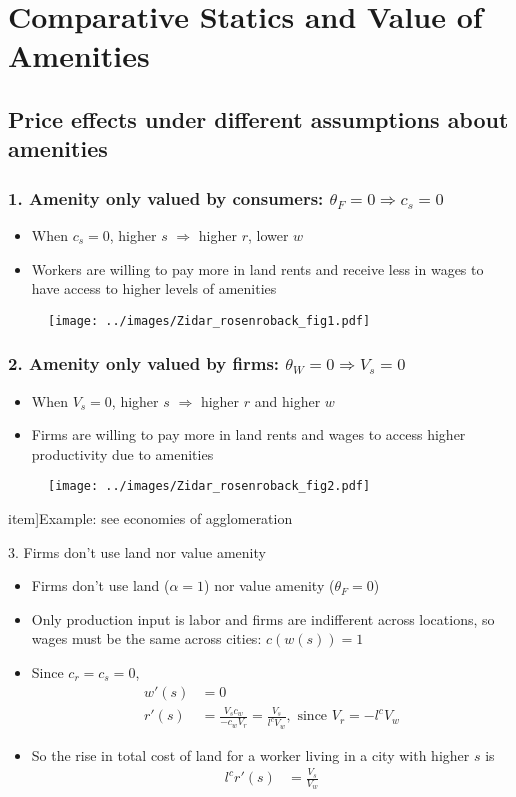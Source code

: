\documentclass[11pt,notes=hide,aspectratio=169]{beamer}
\begin{document}
\section{Comparative Statics and Value of Amenities}
\subsection{Price effects under different assumptions about amenities}
\begin{frame}
\frametitle{1. Amenity only valued by consumers: $\theta_F=0 \Rightarrow c_s = 0$}
\begin{itemize}
\item When $c_s = 0$, higher $s$ $\Rightarrow$ higher $r$, lower $w$
\item Workers are willing to pay more in land rents and receive less in wages to have access to higher levels of amenities
\end{itemize}
\begin{figure}
\texttt{[image: ../images/Zidar\_rosenroback\_fig1.pdf]}
\end{figure}
\end{frame}
\begin{frame}
\frametitle{2. Amenity only valued by firms: $\theta_W=0 \Rightarrow  V_s = 0$}
\begin{itemize}
\item When $V_s = 0$, higher $s$ $\Rightarrow$ higher $r$ and higher $w$
\item Firms are willing to pay more in land rents and wages to access higher productivity due to amenities
\end{itemize}
\begin{figure}
\texttt{[image: ../images/Zidar\_rosenroback\_fig2.pdf]}
\end{figure}
item]{Example: see economies of agglomeration}
\end{frame}
\begin{frame}{3. Firms don't use land nor value amenity}
\begin{itemize}
\item Firms don't use land ($\alpha=1$) nor value amenity ($\theta_F=0$)
\item Only production input is labor and firms are indifferent across locations, so wages must be the same across cities: $c(w(s))=1$\\$\;$\\
\item Since  $c_r = c_s = 0$, 
\begin{align*}
w'(s) &= 0 \\
r'(s) &= \frac{V_sc_w}{- c_wV_r} = \frac{V_s}{ l^c V_w}, \text{ since } V_r = -l^c V_w
\end{align*} 
\item So the rise in total cost of land for a worker living in a city with higher $s$ is 
\begin{align*}
l^c r'(s) &=  \frac{V_s}{ V_w}
\end{align*} 
\end{itemize}
\end{frame}
\end{document}
